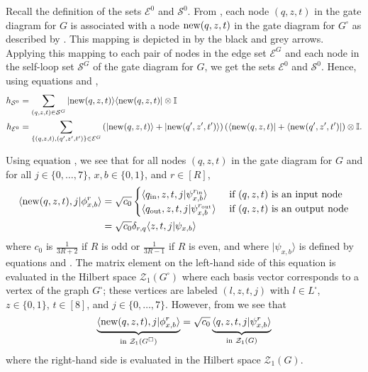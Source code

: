 \documentclass[../thesis-main/thesis-main]{subfiles}
\begin{document}
Recall the definition of the sets $\mathcal{E}^{0}$ and $\mathcal{S}^{0}$. From , each node $(q,z,t)$ in the gate diagram for $G$ is associated with a node $\operatorname{new}(q,z,t)$ in the gate diagram for $G^{\square}$ as described by . This mapping is depicted in  by the black and grey arrows. Applying this mapping to each pair of nodes in the edge set $\mathcal{E}^{G}$ and each node in the self-loop set $\mathcal{S}^{G}$ of the gate diagram for $G$, we get the sets $\mathcal{E}^{0}$ and $\mathcal{S}^{0}$. Hence, using equations  and ,
\begin{align}
h_{\mathcal{S}^0} &=\sum_{(q,z,t)\in \mathcal{S}^G} |{\operatorname{new}(q,z,t)}\rangle\langle{\operatorname{new}(q,z,t)}|\otimes \mathbb{I} \label{eq:hS0}\\
h_{\mathcal{E}^0} &=\sum_{\{(q,z,t),(q^\prime,z^\prime,t^\prime)\}\in \mathcal{E}^G} \left(|{\operatorname{new}(q,z,t)}\rangle+|{\operatorname{new}(q^\prime,z^\prime,t^\prime)}\rangle\right)\left(\langle{\operatorname{new}(q,z,t)}|+\langle{\operatorname{new}(q^\prime,z^\prime,t^\prime)}|\right)\otimes \mathbb{I}.\label{eq:hE0}
\end{align}

Using equation , we see that for all nodes $(q,z,t)$ in the gate diagram for $G$ and for all $j\in\{0,\ldots,7\}$, $x,b\in\{0,1\}$, and $r\in[R]$,
\begin{align}
\langle{\operatorname{new}(q,z,t),j}|\phi^r_{x,b}\rangle & =\sqrt{c_0}
\begin{cases}
\langle q_{\mathrm{in}},z,t,j|\psi^{r_{\mathrm{in}}}_{x,b}\rangle & \text{ if $(q,z,t)$ is an input node}\\
\langle q_{\mathrm{out}},z,t,j|\psi^{r_{\mathrm{out}}}_{x,b}\rangle & \text{ if $(q,z,t)$ is an output node}
\end{cases}\nonumber \\
&=\sqrt{c_0}\delta_{r,q} \langle z,t,j|\psi_{x,b}\rangle
\label{eq:mat_el_newnodes}
\end{align}
where $c_0$ is $\frac{1}{3R+2}$ if $R$ is odd or $\frac{1}{3R-1}$ if $R$ is even, and where $|\psi_{x,b}\rangle$ is defined by equations  and . The matrix element on the left-hand side of this equation is evaluated in the Hilbert space $\mathcal{Z}_1 (G^\square)$ where each basis vector corresponds to a vertex of the graph $G^\square$; these vertices are labeled $(l,z,t,j)$ with $l\in L^\square$, $z\in\{0,1\}$, $t\in[8]$, and $j\in\{0,\ldots,7\}$. However, from  we see that
\begin{equation}
\underbrace{\langle \operatorname{new}(q,z,t),j|\phi^r_{x,b}\rangle}_{\text{in } \mathcal{Z}_1 (G^\square)}=\sqrt{c_0}\underbrace{\langle q,z,t,j|\psi^r_{x,b}\rangle}_{\text{in } \mathcal{Z}_1 (G)} \label{eq:twoHspaces}
\end{equation}
where the right-hand side is evaluated in the Hilbert space $\mathcal{Z}_1 (G)$.
\end{document}
